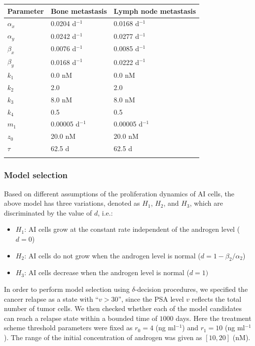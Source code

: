 \begin{table}[htb]
{\begin{tabular}{lll}\toprule
Parameter  & Bone metastasis & Lymph node metastasis  \\\midrule
$\alpha_x$ & 0.0204 d$^{-1}$ & 0.0168 d$^{-1}$  \\
$\alpha_y$ & 0.0242 d$^{-1}$ & 0.0277 d$^{-1}$  \\
$\beta_x$  & 0.0076 d$^{-1}$ & 0.0085 d$^{-1}$  \\
$\beta_y$  & 0.0168 d$^{-1}$ & 0.0222 d$^{-1}$  \\
$k_1$     & 0.0 nM & 0.0 nM \\
$k_2$     & 2.0 & 2.0  \\
$k_3$     & 8.0 nM & 8.0 nM \\
$k_4$     & 0.5 & 0.5  \\
$m_1$     & 0.00005 d$^{-1}$ & 0.00005 d$^{-1}$  \\
$z_0$     & 20.0 nM & 20.0 nM  \\
$\tau$     & 62.5 d & 62.5 d \\
\botrule
\end{tabular}}{}
 \vspace{-0.7cm}
\end{table}

\subsubsection{Model selection}
Based on different assumptions of the proliferation dynamics of AI cells, the above model has three variations, denoted as $H_1$, $H_2$, and $H_3$, which are discriminated by the value of $d$, i.e.:
\begin{itemize}
\item $H_1$: AI cells grow at the constant rate independent of the androgen level ($d=0$)\\
\item $H_2$: AI cells do not grow when the androgen level is normal ($d=1-\beta_2/\alpha_2$)\\
\item $H_3$: AI cells decrease when the androgen level is normal ($d=1)$
\end{itemize}

In order to perform model selection using $\delta$-decision procedures, we specified the cancer relapse as a state with ``$v>30$'', since the PSA level $v$ reflects the total number of tumor cells. We then checked whether each of the model candidates can reach a relapse state within a bounded time of $1000$ days. Here the treatment scheme threshold parameters were fixed as $r_0=4$ (ng ml$^{-1}$) and $r_1=10$ (ng ml$^{-1}$). The range of the initial concentration of androgen was given as $[10, 20]$ (nM).

